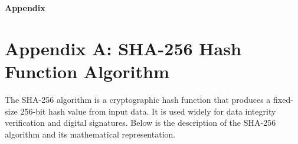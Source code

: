\clearpage
\thispagestyle{empty} 
\begin{center}
    \vspace*{\fill} 
    \Huge \textbf{Appendix} \\
    \vspace*{\fill}
\end{center}
\clearpage

\appendix
{} 
\fancyhead[]{}
\fancyhead[LE,RO]{\thepage}

\renewcommand{\thesection}{\Alph{section}}
\section*{\centering Appendix A: SHA-256 Hash Function Algorithm}

The SHA-256 algorithm is a cryptographic hash function that produces a fixed-size 256-bit hash value from input data. It is used widely for data integrity verification and digital signatures. Below is the description of the SHA-256 algorithm and its mathematical representation.


